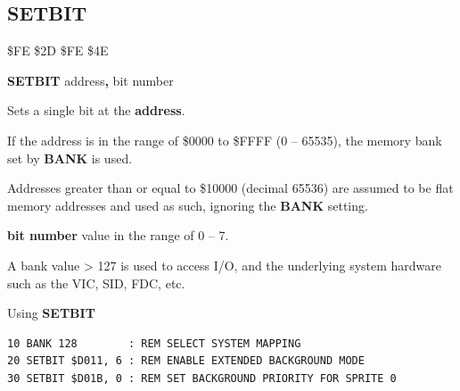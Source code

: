 \newpage
\subsection{SETBIT}
\begin{description}[leftmargin=2cm,style=nextline]
\item [Token:]    \$FE \$2D \$FE \$4E

\item [Format:]   {\bf SETBIT} address{\bf,} bit number

\item [Usage:]    Sets a single bit at the {\bf address}.

                  If the address is in the range of \$0000 to \$FFFF (0 -- 65535), the memory bank set by {\bf BANK} is used.

                  Addresses greater than or equal to \$10000 (decimal 65536) are assumed to be flat memory addresses and used as such, ignoring the {\bf BANK} setting.

                  {\bf bit number} value in the range of 0 -- 7.

                  A bank value > 127 is used to access I/O, and the underlying system hardware such as the VIC, SID, FDC, etc.

\item [Example:]  Using {\bf SETBIT}

\begin{tcolorbox}[colback=black,coltext=white]
\verbatimfont{\codefont}
\begin{verbatim}
10 BANK 128        : REM SELECT SYSTEM MAPPING
20 SETBIT $D011, 6 : REM ENABLE EXTENDED BACKGROUND MODE
30 SETBIT $D01B, 0 : REM SET BACKGROUND PRIORITY FOR SPRITE 0
\end{verbatim}
\end{tcolorbox}
\end{description}


\newpage

